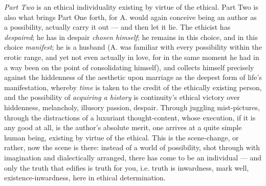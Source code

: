 \documentclass[12pt,a4paper,openany]{book}
\newcommand{\opage}[1]{\marginnote{\footnotesize\textit{[#1]}}}
\begin{document}
\emph{Part Two} is an ethical individuality existing by virtue of the ethical. Part
Two is also what brings Part One forth, for A. would again conceive being an author as
a possibility, actually carry it out --- and then let it lie. The ethicist has
\emph{despaired}; he has in despair \emph{chosen himself}; he remains in this choice,
and in this choice \emph{manifest}; he is a husband (A. was familiar with every
possibility within the erotic range, and yet not even actually in love, for in the same
moment he had in a way been on the point of consolidating himself), and collects
himself precisely against the hiddenness of the aesthetic upon marriage as the deepest
form of life's manifestation, whereby
\setcounter{footnote}{0}%
\opage{191}\emph{time} is taken to the credit of the ethically existing person, and the
possibility of \emph{acquiring a history} is continuity's ethical victory over
hiddenness, melancholy, illusory passion, despair. Through juggling mist-pictures,
through the distractions of a luxuriant thought-content, whose execution, if it is any
good at all, is the author's absolute merit, one arrives at a quite simple human being,
existing by virtue of the ethical. This is the scene-change, or rather, now the scene
is there: instead of a world of possibility, shot through with imagination and
dialectically arranged, there has come to be an individual --- and only the truth that
edifies is truth for you, i.e. truth is inwardness, mark well, existence-inwardness,
here in ethical determination.
\end{document}

